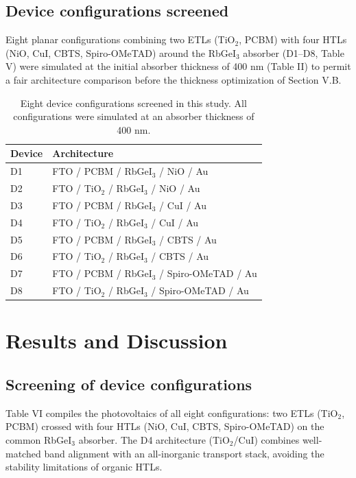 \documentclass[review]{elsarticle}
\begin{document}
\subsection{Device configurations screened}
Eight planar configurations combining two ETLs (TiO$_{2}$, PCBM) with four HTLs (NiO, CuI, CBTS, Spiro-OMeTAD) around the RbGeI$_{3}$ absorber (D1--D8, Table V) were simulated at the initial absorber thickness of 400 nm (Table II) to permit a fair architecture comparison before the thickness optimization of Section V.B.

\begin{table}[htbp]
\centering
{\small\setlength{\tabcolsep}{3pt}
\begin{tabularx}{\textwidth}{XX}
\hline
Device & Architecture
\\\hline
D1 & FTO / PCBM / RbGeI$_{3}$ / NiO / Au\\
D2 & FTO / TiO$_{2}$ / RbGeI$_{3}$ / NiO / Au\\
D3 & FTO / PCBM / RbGeI$_{3}$ / CuI / Au\\
D4 & FTO / TiO$_{2}$ / RbGeI$_{3}$ / CuI / Au\\
D5 & FTO / PCBM / RbGeI$_{3}$ / CBTS / Au\\
D6 & FTO / TiO$_{2}$ / RbGeI$_{3}$ / CBTS / Au\\
D7 & FTO / PCBM / RbGeI$_{3}$ / Spiro-OMeTAD / Au\\
D8 & FTO / TiO$_{2}$ / RbGeI$_{3}$ / Spiro-OMeTAD / Au\\
\hline
\end{tabularx}
}
\caption{Eight device configurations screened in this study. All configurations were simulated at an absorber thickness of 400 nm.}
\end{table}

\section{Results and Discussion}

\subsection{Screening of device configurations}
Table VI compiles the photovoltaics of all eight configurations: two ETLs (TiO$_{2}$, PCBM) crossed with four HTLs (NiO, CuI, CBTS, Spiro-OMeTAD) on the common RbGeI$_{3}$ absorber.
The D4 architecture (TiO$_{2}$/CuI) combines well-matched band alignment with an all-inorganic transport stack, avoiding the stability limitations of organic HTLs.
\end{document}
